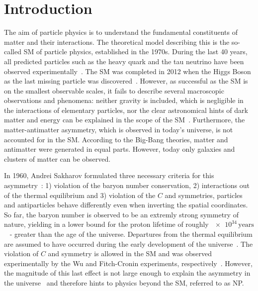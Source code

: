 \chapter{Introduction}

\linespread{1.08}\selectfont

The aim of particle physics is to understand the fundamental constituents of matter and their interactions.
The theoretical model describing this is the so-called \ac{SM} of particle physics, established in the \num{1970}s.
During the last \num{40} years, all predicted particles such as the heavy \tquark quark and the tau neutrino have been observed experimentally~\cite{Abachi:1994td,Abe:1995hr,Kodama:2000mp}.
The \ac{SM} was completed in \num{2012} when the Higgs Boson as the last missing particle was discovered~\cite{Chatrchyan:2012xdj, Aad:2012tfa}.
However, as successful as the \ac{SM} is on the smallest observable scales, it fails to describe several macroscopic observations and phenomena:
neither gravity is included, which is negligible in the interactions of elementary particles, nor the clear astronomical hints of dark matter and energy can be explained in the scope of the \ac{SM}~\cite{Corbelli:1999af,Kowalski:2008ez}.
Furthermore, the matter-antimatter asymmetry, which is observed in today's universe, is not accounted for in the \ac{SM}.
According to the Big-Bang theories, matter and antimatter were generated in equal parts.
However, today only galaxies and clusters of matter can be observed.

In \num{1960}, Andrei Sakharov formulated three necessary criteria for this asymmetry~\cite{Sakharov:1967dj}: 1) violation of the baryon number conservation, 2) interactions out of the thermal equilibrium and 3) violation of the $C$ and \CP symmetries, \ie particles and antiparticles behave differently even when inverting the spatial coordinates.
So far, the baryon number is observed to be an extremly strong symmetry of nature, yielding in a lower bound for the proton lifetime of roughly $\num{e34}\,\text{years}$~\cite{Nishino:2009aa} - greater than the age of the universe.
Departures from the thermal equilibrium are assumed to have occurred during the early development of the universe~\cite{Kolb:1990vq}.
The violation of $C$ and \CP symmetry is allowed in the \ac{SM} and was observed experimentally by the Wu and Fitch-Cronin experiments, respectively~\cite{Wu:1957my, Christenson:1964fg}.
However, the magnitude of this last effect is not large enough to explain the asymmetry in the universe~\cite{Gavela:1993ts} and therefore hints to physics beyond the \ac{SM}, referred to as \ac{NP}.

